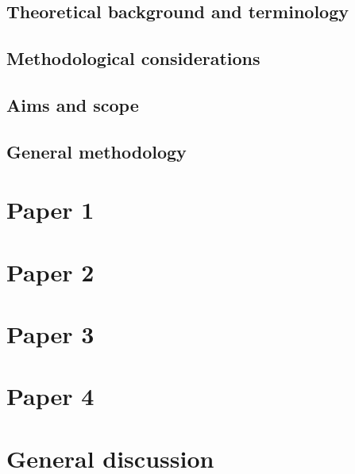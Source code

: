 \documentclass[12pt]{report}
\begin{document}
    \section{Theoretical background and terminology}
    \label{sec:theory}
        

    \section{Methodological considerations}
    \label{sec:theory}
     
    
    \section{Aims and scope}
    \label{sec:aims_scope}
    

    \section{General methodology}
    \label{sec:methods}
    


\chapter{Paper 1}
\label{chap:paper1}

\chapter{Paper 2}
\label{chap:paper2}

\chapter{Paper 3}
\label{chap:paper3}

\chapter{Paper 4}
\label{chap:paper4}

\chapter{General discussion}
\label{chap:discussion}

\printbibliography
\end{document}
